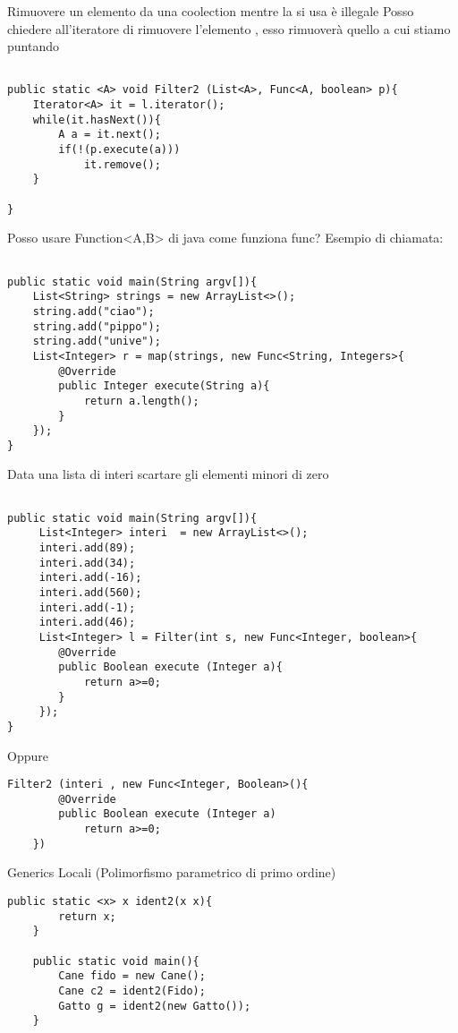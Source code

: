 Rimuovere un elemento da una coolection mentre la si usa è illegale \newline
Posso chiedere all'iteratore di rimuovere l'elemento , esso rimuoverà quello a cui stiamo puntando \newline


\begin{lstlisting}[basicstyle=\small,]

public static <A> void Filter2 (List<A>, Func<A, boolean> p){
	Iterator<A> it = l.iterator();
	while(it.hasNext()){
		A a = it.next();
		if(!(p.execute(a)))
			it.remove();
	}

}

\end{lstlisting}




Posso usare Function<A,B> di java come funziona func? \newline
Esempio di chiamata:

\begin{lstlisting}[basicstyle=\small,]

public static void main(String argv[]){
	List<String> strings = new ArrayList<>();
	string.add("ciao");
	string.add("pippo");
	string.add("unive");
	List<Integer> r = map(strings, new Func<String, Integers>{
		@Override 
		public Integer execute(String a){
			return a.length();
		}	
	});
}
\end{lstlisting}


Data una lista di interi scartare gli elementi minori di zero

\begin{lstlisting}[basicstyle=\small,]

public static void main(String argv[]){
	 List<Integer> interi  = new ArrayList<>();
	 interi.add(89);
	 interi.add(34);
	 interi.add(-16);
	 interi.add(560);
	 interi.add(-1);
	 interi.add(46);
	 List<Integer> l = Filter(int s, new Func<Integer, boolean>{
	 	@Override
	 	public Boolean execute (Integer a){
	 		return a>=0;
	 	}
	 });
}
\end{lstlisting}

Oppure 

\begin{lstlisting}[basicstyle=\small,]
	Filter2 (interi , new Func<Integer, Boolean>(){
		@Override
		public Boolean execute (Integer a)
			return a>=0;
	})
\end{lstlisting}

Generics Locali (Polimorfismo parametrico di primo ordine)

\begin{lstlisting}[basicstyle=\small,]
	public static <x> x ident2(x x){
		return x;
	}
	
	public static void main(){
		Cane fido = new Cane();
		Cane c2 = ident2(Fido);
		Gatto g = ident2(new Gatto());
	}
\end{lstlisting}





















